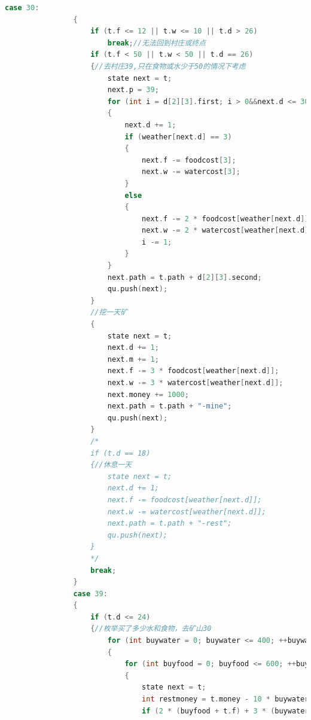 \documentclass[withoutpreface,bwprint]{cumcmthesis} %
\begin{document}
\begin{appendices}
\begin{lstlisting}[language=c++]
                case 30:
                {
                    if (t.f <= 12 || t.w <= 10 || t.d > 26)
                        break;//无法回到村庄或终点
                    if (t.f < 50 || t.w < 50 || t.d == 26)
                    {//去村庄39,只在食物或水少于50的情况下考虑
                        state next = t;
                        next.p = 39;
                        for (int i = d[2][3].first; i > 0&&next.d <= 30;)
                        {
                            next.d += 1;
                            if (weather[next.d] == 3)
                            {
                                next.f -= foodcost[3];
                                next.w -= watercost[3];
                            }
                            else
                            {
                                next.f -= 2 * foodcost[weather[next.d]];
                                next.w -= 2 * watercost[weather[next.d]];
                                i -= 1;
                            }
                        }
                        next.path = t.path + d[2][3].second;
                        qu.push(next);
                    }
                    //挖一天矿
                    {
                        state next = t;
                        next.d += 1;
                        next.m += 1;
                        next.f -= 3 * foodcost[weather[next.d]];
                        next.w -= 3 * watercost[weather[next.d]];
                        next.money += 1000;
                        next.path = t.path + "-mine";
                        qu.push(next);
                    }
                    /*
                    if (t.d == 18)
                    {//休息一天
                        state next = t;
                        next.d += 1;
                        next.f -= foodcost[weather[next.d]];
                        next.w -= watercost[weather[next.d]];
                        next.path = t.path + "-rest";
                        qu.push(next);
                    }
                    */
                    break;
                }
                case 39:
                {
                    if (t.d <= 24)
                    {//枚举买了多少水和食物，去矿山30
                        for (int buywater = 0; buywater <= 400; ++buywater)
                        {
                            for (int buyfood = 0; buyfood <= 600; ++buyfood)
                            {
                                state next = t;
                                int restmoney = t.money - 10 * buywater - 20 * buyfood;
                                if (2 * (buyfood + t.f) + 3 * (buywater + t.w) >= 1199 &&

\end{lstlisting}
\end{appendices}
\end{document}
